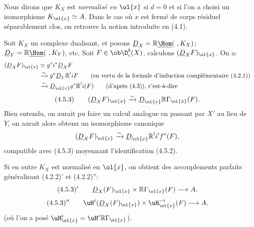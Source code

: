 Nous dirons que $K_X$ est \emph{normalisé en $\ol{x}$} si $d=0$ et si l'on a choisi un isomorphisme $K_{\ol{x}}\simeq A$. Dans le cas où $x$ est fermé de corps résiduel séparablement clos, on retrouve la notion introduite en (4.1).

Soit $K_X$ un complexe dualisant, et posons $\underline{D}_X=\mathbb{R}\underline{\Hom}(\ ,K_X)$; $\underline{D}_Y=\mathbb{R}\underline{\Hom}(\ ,K_Y)$, etc. Soit $F\in\ob\D_c^b(X)$, calculons $(\underline{D}_XF)_{\ol{x}}$. On a:
\[
\begin{aligned}
(\underline{D}_XF)_{\ol{x}}&\simeq g^*i^*\underline{D}_X F\\
&\xrightarrow{\sim}g^*\underline{D}_Y\mathbb{R}^{!}iF\qquad\text{(en vertu de la formule d'induction complémentaire (4.2.1))}\\
&\xrightarrow{\sim}\underline{D}_{\ol{x}}g^*\mathbb{R}^{!}i(F)\qquad\text{(d'après (4.3)), c'est-à-dire}
\end{aligned}
\]
\[
(4.5.3)\qquad (\underline{D}_X F)_{\ol{x}}\xrightarrow{\sim}\underline{D}_{\ol{x}}\mathbb{R}\Gamma_{\ol{x}}(F).
\]
Bien entendu, on aurait pu faire un calcul analogue en passant par 
$X'$ au
lieu de $Y$, on aurait alors obtenu un isomorphisme canonique
\[
(\underline{D}_XF)_{\ol{x}}\xrightarrow{\sim}\underline{D}_{\ol{x}}\mathbb{R}^{!}i'f^*(F),
\]
compatible avec (4.5.3) moyennant l'identification (4.5.2).

Si en outre $K_X$ est normalisé en $\ol{x}$, on obtient des accouplements parfaits généralisant (4.2.2)' et (4.2.2)'':
\[
(4.5.3)'\qquad \underline{D}_X(F)_{\ol{x}}\times \mathbb{R}\Gamma_{\ol{x}}(F)\longrightarrow A,
\]
\[
(4.5.3)''\qquad \uH^i(\underline{D}_X(F)_{\ol{x}})\times \uH_{\ol{x}}^{-i}(F)\longrightarrow A,
\]
(où l'on a posé $\uH_{\ol{x}}^i=\uH^i\mathbb{R}\Gamma_{\ol{x}}$).

